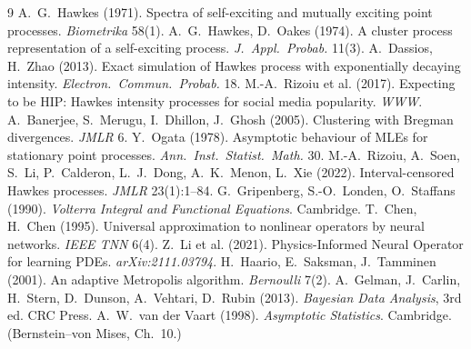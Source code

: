 \documentclass[11pt,openany]{book}
\theoremstyle{plain}
\theoremstyle{definition}
\theoremstyle{remark}
\newcounter{exc}[chapter]
\begin{document}
\backmatter
\begin{thebibliography}{9}
\small
{} A.~G.~Hawkes (1971). Spectra of self-exciting and mutually exciting point processes. \emph{Biometrika} 58(1).
 A.~G.~Hawkes, D.~Oakes (1974). A cluster process representation of a self-exciting process. \emph{J.~Appl.~Probab.} 11(3).
 A.~Dassios, H.~Zhao (2013). Exact simulation of Hawkes process with exponentially decaying intensity. \emph{Electron.~Commun.~Probab.} 18.
 M.-A.~Rizoiu et al. (2017). Expecting to be HIP: Hawkes intensity processes for social media popularity. \emph{WWW}.
 A.~Banerjee, S.~Merugu, I.~Dhillon, J.~Ghosh (2005). Clustering with Bregman divergences. \emph{JMLR} 6.
 Y.~Ogata (1978). Asymptotic behaviour of MLEs for stationary point processes. \emph{Ann.~Inst.~Statist.~Math.} 30.
 M.-A.~Rizoiu, A.~Soen, S.~Li, P.~Calderon, L.~J.~Dong, A.~K.~Menon, L.~Xie (2022). Interval-censored Hawkes processes. \emph{JMLR} 23(1):1--84.
 G.~Gripenberg, S.-O.~Londen, O.~Staffans (1990). \emph{Volterra Integral and Functional Equations}. Cambridge.
 T.~Chen, H.~Chen (1995). Universal approximation to nonlinear operators by neural networks. \emph{IEEE TNN} 6(4).
 Z.~Li et al. (2021). Physics-Informed Neural Operator for learning PDEs. \emph{arXiv:2111.03794}.
 H.~Haario, E.~Saksman, J.~Tamminen (2001). An adaptive Metropolis algorithm. \emph{Bernoulli} 7(2).
 A.~Gelman, J.~Carlin, H.~Stern, D.~Dunson, A.~Vehtari, D.~Rubin (2013). \emph{Bayesian Data Analysis}, 3rd ed. CRC Press.
 A.~W.~van der Vaart (1998). \emph{Asymptotic Statistics}. Cambridge. (Bernstein--von Mises, Ch.~10.)
\end{thebibliography}
\end{document}

